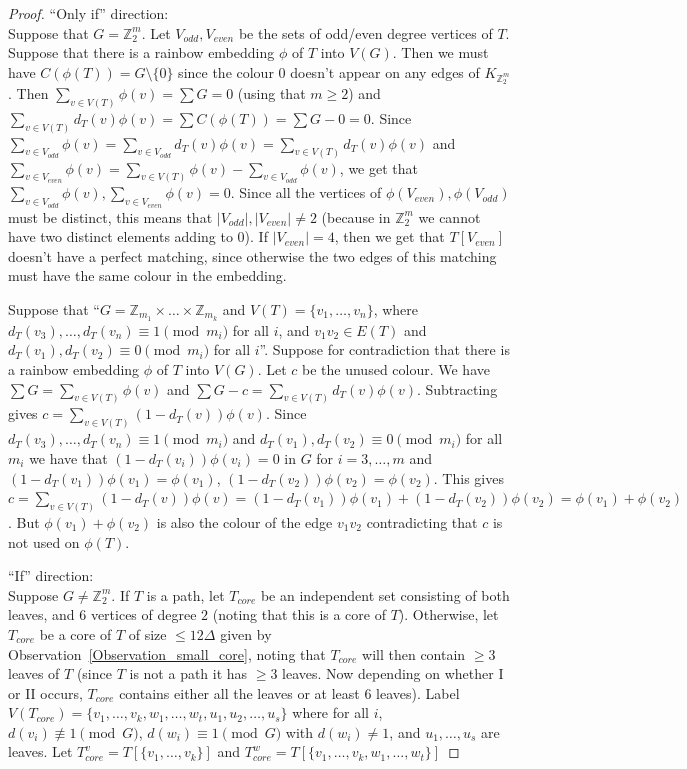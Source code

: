 \documentclass[10pt,a4paper]{amsart}
\begin{document}
\begin{proof}

``Only if'' direction:\\
Suppose that $G=\mathbb{Z}_2^m$. Let $V_{odd}, V_{even}$ be the sets of odd/even degree vertices of $T$.
Suppose that there is a rainbow embedding $\phi$ of $T$ into $V(G)$. Then we must have $C(\phi(T))=G\setminus \{0\}$ since the colour $0$ doesn't appear on any edges of $K_{\mathbb{Z}_2^m}$.
Then $\sum_{v\in V(T)}\phi(v)=\sum G=0$ (using that $m\geq 2$) and $\sum_{v\in V(T)}d_T(v)\phi(v)=\sum C(\phi(T))=\sum G-0=0$. Since $\sum_{v\in V_{odd}}\phi(v)=\sum_{v\in V_{odd}}d_T(v)\phi(v)=\sum_{v\in V(T)}d_T(v)\phi(v)$ and $\sum_{v\in V_{even}}\phi(v)= \sum_{v\in V(T)}\phi(v)-\sum_{v\in V_{odd}}\phi(v)$, we get that $\sum_{v\in V_{odd}}\phi(v), \sum_{v\in V_{even}}\phi(v)=0$. Since all the vertices of $\phi(V_{even}), \phi(V_{odd})$ must be distinct, this means that $|V_{odd}|, |V_{even}|\neq 2$ (because in $\mathbb{Z}_2^m$ we cannot have two distinct elements adding to $0$). If $|V_{even}|=4$, then we get that $T[V_{even}] $ doesn't have a perfect matching, since otherwise the two edges of this matching must have the same colour in the embedding.


Suppose that ``$G=\mathbb{Z}_{m_1}\times\dots \times \mathbb{Z}_{m_k}$ and $V(T)=\{v_1, \dots, v_n\}$, where $d_T(v_3), \dots, d_T(v_n)\equiv 1\pmod {m_i}$ for all $i$, and $v_1v_2\in E(T)$ and $d_T(v_1), d_T(v_2)\equiv 0\pmod {m_i}$ for all $i$''.
Suppose for contradiction that there is a rainbow embedding $\phi$ of $T$ into $V(G)$. Let $c$ be the unused colour. We have $\sum G=\sum_{v\in V(T)} \phi(v)$ and $\sum G-c=\sum_{v\in V(T)} d_T(v)\phi(v)$. Subtracting gives $c=\sum_{v\in V(T)} (1-d_T(v))\phi(v)$. Since $d_T(v_3), \dots, d_T(v_n)\equiv 1\pmod {m_i}$ and $d_T(v_1), d_T(v_2)\equiv 0\pmod {m_i}$ for all $m_i$ we have that $(1-d_T(v_i))\phi(v_i)=0$ in $G$ for $i=3, \dots, m$ and $(1-d_T(v_1))\phi(v_1)=\phi(v_1)$, $(1-d_T(v_2))\phi(v_2)=\phi(v_2)$.
 This gives  $c=\sum_{v\in V(T)} (1-d_T(v))\phi(v)=(1-d_T(v_1))\phi(v_1)+(1-d_T(v_2))\phi(v_2)=\phi(v_1)+\phi(v_2)$. But $\phi(v_1)+\phi(v_2)$ is also the colour of the edge $v_1v_2$ contradicting that $c$ is not used on $\phi(T)$.




``If'' direction:\\
Suppose $G\neq \mathbb{Z}_2^m$. If $T$ is a path, let $T_{core}$  be an independent set consisting  of both leaves, and $6$ vertices of degree $2$ (noting that this is a core of $T$). Otherwise, let  $T_{core}$ be a core of $T$ of size $\leq 12\Delta$ given by Observation~\ref{Observation_small_core}, noting that $T_{core}$ will then contain $\geq 3$ leaves of $T$ (since $T$ is not a path it has $\geq 3$ leaves. Now depending on whether I or II occurs, $T_{core}$ contains either all the leaves or at least $6$  leaves). Label $V(T_{core})=\{v_1, \dots, v_k, w_1, \dots, w_t, u_1, u_2, \dots, u_s\}$ where
for all $i$, $d(v_i)\not\equiv 1 \pmod G$,  $d(w_i)\equiv 1 \pmod G$ with $d(w_i)\neq 1$, and $u_1, \dots, u_s$ are leaves.  
Let $T_{core}^{v}=T[\{v_{1}, \dots, v_k\}]$ and
$T_{core}^{w}=T[\{v_{1}, \dots, v_k, w_1, \dots, w_t\}]$


\end{proof}
\end{document}
